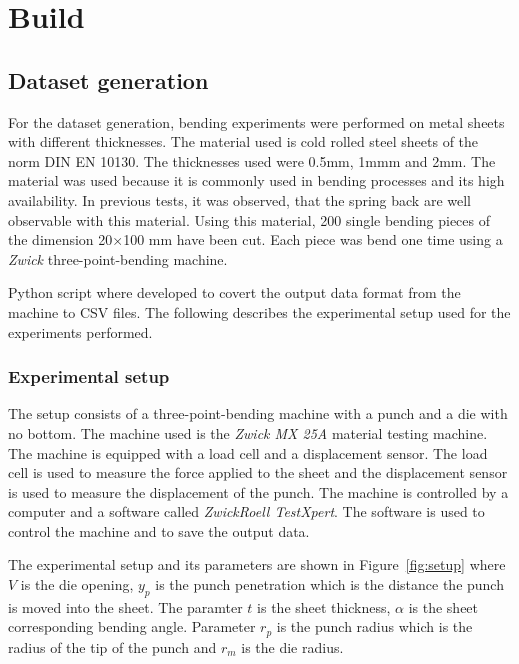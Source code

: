
\chapter{Build}

\section{Dataset generation}
For the dataset generation, bending experiments were performed on metal sheets with different thicknesses.
The material used is cold rolled steel sheets of the norm DIN EN 10130. The thicknesses used were 0.5mm, 1mmm and 2mm.
The material was used because it is commonly used in bending processes and its high availability. In previous tests, it was observed, that the spring back are well observable with this material.
Using this material, 200 single bending pieces of the dimension 20×100 mm have been cut.
Each piece was bend one time using a \textit{Zwick} three-point-bending machine.

Python script where developed to covert the output data format from the machine to CSV files.
The following describes the experimental setup used for the experiments performed.

\subsection{Experimental setup}
The setup consists of a three-point-bending machine with a punch and a die with no bottom. The machine used is the \textit{Zwick MX 25A} material testing machine.
The machine is equipped with a load cell and a displacement sensor. The load cell is used to measure the force applied to the sheet and the displacement sensor is used to measure the displacement of the punch.
The machine is controlled by a computer and a software called \textit{ZwickRoell TestXpert}. The software is used to control the machine and to save the output data.

The experimental setup and its parameters are shown in Figure~\ref{fig:setup} where $V$ is the die opening, $y_p$ is the punch penetration which is the distance the punch is moved into the sheet.
The paramter $t$ is the sheet thickness,  $\alpha$ is the sheet corresponding bending angle. Parameter $r_p$ is the punch radius which is the radius of the tip of the punch and $r_m$ is the die radius.



